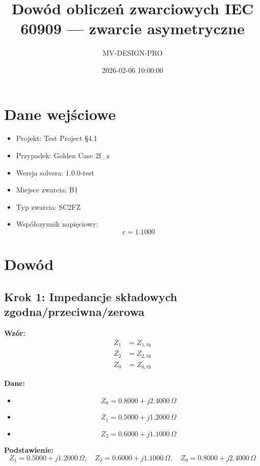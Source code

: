 \documentclass[11pt,a4paper]{article}
\title{Dowód obliczeń zwarciowych IEC 60909 — zwarcie asymetryczne}
\author{MV-DESIGN-PRO}
\date{2026-02-06 10:00:00}
\begin{document}
\maketitle

\tableofcontents

\newpage

\section{Dane wejściowe}
\begin{itemize}
  \item Projekt: Test Project §4.1
  \item Przypadek: Golden Case 2f\_z
  \item Wersja solvera: 1.0.0-test
  \item Miejsce zwarcia: B1
  \item Typ zwarcia: SC2FZ
  \item Współczynnik napięciowy:
$$
c = 1.1000
$$
\end{itemize}





\section{Dowód}

\subsection{Krok 1: Impedancje składowych zgodna/przeciwna/zerowa}

\textbf{Wzór:}
$$
\begin{aligned}Z_1 &= Z_{1,\mathrm{th}} \\Z_2 &= Z_{2,\mathrm{th}} \\Z_0 &= Z_{0,\mathrm{th}}\end{aligned}
$$

\textbf{Dane:}
\begin{itemize}
  \item
$$
Z_0 = 0.8000 + j2.4000\,\Omega
$$
  \item
$$
Z_1 = 0.5000 + j1.2000\,\Omega
$$
  \item
$$
Z_2 = 0.6000 + j1.1000\,\Omega
$$
\end{itemize}

\textbf{Podstawienie:}
$$
Z_1 = 0.5000 + j1.2000\,\Omega, \quad Z_2 = 0.6000 + j1.1000\,\Omega, \quad Z_0 = 0.8000 + j2.4000\,\Omega
$$
\end{document}
